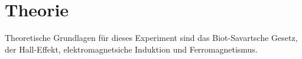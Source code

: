 \section{Theorie}
\label{sec:Theorie}
Theoretische Grundlagen für dieses Experiment sind das Biot-Savartsche Gesetz, der Hall-Effekt, elektromagnetsiche Induktion und Ferromagnetismus.
